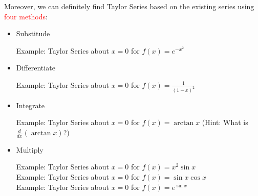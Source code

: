 \documentclass[12pt]{article}
\theoremstyle{definition}
\theoremstyle{definition}
\theoremstyle{remark}
\theoremstyle{definition}
\theoremstyle{definition}
\theoremstyle{definition}
\begin{document}
Moreover, we can definitely find Taylor Series based on the existing series using \textcolor{red}{four methods}:
\begin{itemize}
	\item Substitude
	
Example: Taylor Series about $x=0$ for $f(x)=e^{-x^2}$	
	
	\item Differentiate 
	
Example: Taylor Series about $x=0$ for $f(x)=\frac{1}{(1-x)^2}$	

	\item Integrate
	
Example: Taylor Series about $x=0$ for $f(x)=\arctan x$ (Hint: What is $\frac{d}{dx}(\arctan x)$?)			
	\item Multiply
	
	Example: Taylor Series about $x=0$ for $f(x)=x^2 \sin x$\\
	Example: Taylor Series about $x=0$ for $f(x)=\sin x \cos x$\\
	Example: Taylor Series about $x=0$ for $f(x)=e^{\sin x}$\\

\end{itemize}
\end{document}
